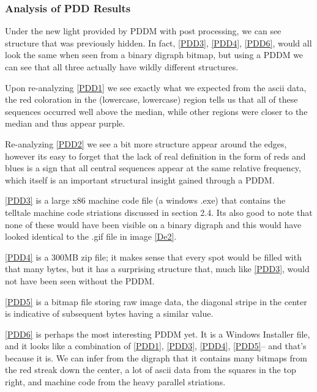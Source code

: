 \documentclass[12pt,a4paper]{article}
\begin{document}
\subsubsection{Analysis of PDD Results}
Under the new light provided by PDDM with post processing, we can see structure 
that was previously hidden. In fact, \ref{PDD3}, \ref{PDD4}, \ref{PDD6}, would all look the same when seen from a binary digraph bitmap, but using a PDDM we can see that all three actually have wildly different structures. 

Upon re-analyzing \ref{PDD1} we see exactly what we expected from the ascii data, the red coloration in the (lowercase, lowercase) region tells us that all of these sequences occurred well above the median, while other regions were closer to the median and thus appear purple.

Re-analyzing \ref{PDD2} we see a bit more structure appear around the edges, however its easy to forget that the lack of real definition in the form of reds and blues is a sign that all central sequences appear at the same relative frequency, which itself is an important structural insight gained through a PDDM.

\ref{PDD3} is a large x86 machine code file (a windows .exe) that contains the telltale machine code striations discussed in section 2.4. Its also good to note that none of these would have been visible on a binary digraph and this would have looked identical to the .gif file in image \ref{De2}.

\ref{PDD4} is a 300MB zip file; it makes sense that every spot would be filled with that many bytes, but it has a surprising structure that, much like \ref{PDD3}, would not have been seen without the PDDM.

\ref{PDD5} is a bitmap file storing raw image data, the diagonal stripe in the center is indicative of subsequent bytes having a similar value. \cite{future}

\ref{PDD6} is perhaps the most interesting PDDM yet. It is a Windows Installer file, and it looks like a combination of \ref{PDD1}, \ref{PDD3}, \ref{PDD4}, \ref{PDD5}-- and that's because it is. We can infer from the digraph that it contains many bitmaps from the red streak down the center, a lot of ascii data from the squares in the top right, and machine code from the heavy parallel striations. 

\newpage


\end{document}
